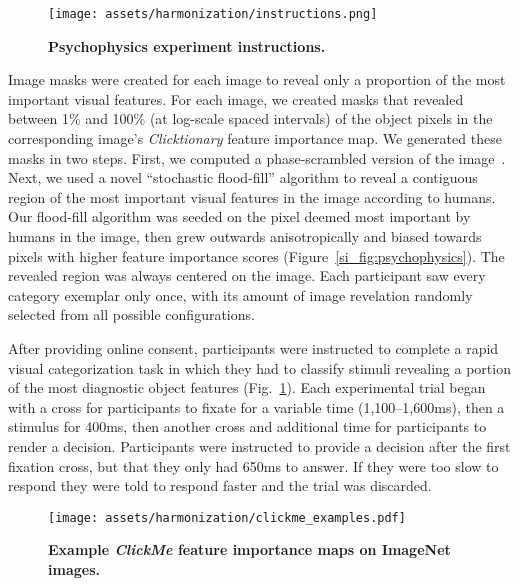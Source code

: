 \begin{figure}[h!]
\begin{center}
   \texttt{[image: assets/harmonization/instructions.png]}
\end{center}
   \caption{\textbf{Psychophysics experiment instructions.}}
\label{si_fig:instructions}
\end{figure}

Image masks were created for each image to reveal only a proportion of the most important visual features. For each image, we created masks that revealed between 1\% and 100\% (at log-scale spaced intervals) of the object pixels in the corresponding image's \textit{Clicktionary} feature importance map. We generated these masks in two steps. First, we computed a phase-scrambled version of the image~\cite{Oppenheim1981-sl, Thomson1999-rp}. Next, we used a novel ``stochastic flood-fill'' algorithm to reveal a contiguous region of the most important visual features in the image according to humans. Our flood-fill algorithm was seeded on the pixel deemed most important by humans in the image, then grew outwards anisotropically and biased towards pixels with higher feature importance scores (Figure~\ref{si_fig:psychophysics}). The revealed region was always centered on the image. Each participant saw every category exemplar only once, with its amount of image revelation randomly selected from all possible configurations. 

After providing online consent, participants were instructed to complete a rapid visual categorization task in which they had to classify stimuli revealing a portion of the most diagnostic object features (Fig.~\ref{si_fig:instructions}). Each experimental trial began with a cross for participants to fixate for a variable time (1,100–1,600ms), then a stimulus for 400ms, then another cross and additional time for participants to render a decision. Participants were instructed to provide a decision after the first fixation cross, but that they only had 650ms to answer. If they were too slow to respond they were told to respond faster and the trial was discarded.


\begin{figure}[h!]
\begin{center}
   \texttt{[image: assets/harmonization/clickme\_examples.pdf]}
\end{center}
   \caption{\textbf{Example \textit{ClickMe} feature importance maps on ImageNet images.}}
\label{si_fig:clickme_examples}
\end{figure}

